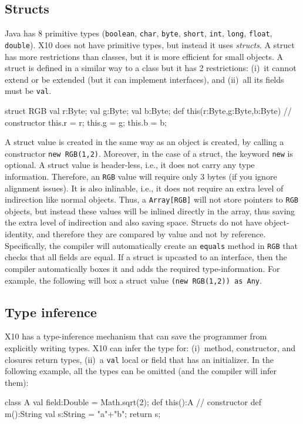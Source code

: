 \documentclass[a4paper]{article}
\def\codesmaller{\small}
\newcommand{\code}[1]{\texttt{\textup{\codesmaller #1}}}
\begin{document}
\subsection{Structs}
Java has 8 primitive types (\code{boolean}, \code{char}, \code{byte}, \code{short}, \code{int}, \code{long}, \code{float}, \code{double}).
X10 does not have primitive types, but instead it uses \emph{structs}.
A struct has more restrictions than classes, but it is more efficient for small objects.
A struct is defined in a similar way to a class but it has 2 restrictions:
    (i)~it cannot extend or be extended (but it can implement interfaces),
    and (ii)~all its fields must be \code{val}.
\begin{xten}
struct RGB {
  val r:Byte;
  val g:Byte;
  val b:Byte;
  def this(r:Byte,g:Byte,b:Byte) { // constructor
    this.r = r;
    this.g = g;
    this.b = b;
  }
}
\end{xten}
A struct value is created in the same way as an object is created, by calling a constructor \code{new RGB(1,2)}.
Moreover, in the case of a struct, the keyword \code{new} is optional.
A struct value is header-less, i.e., it does not carry any type information.
Therefore, an \code{RGB} value will require only 3 bytes (if you ignore alignment issues).
It is also inlinable, i.e., it does not require an extra level of indirection like normal objects.
Thus, a \code{Array[RGB]} will not store pointers to \code{RGB} objects, but instead these values will be inlined
    directly in the array, thus saving the extra level of indirection and also saving space.
Structs do not have object-identity, and therefore they are compared by value and not by reference.
Specifically, the compiler will automatically create an \code{equals} method in \code{RGB} that
    checks that all fields are equal.
If a struct is upcasted to an interface, then the compiler automatically boxes it and adds the required type-information.
For example, the following will box a struct value \code{(new RGB(1,2)) as Any}.


\subsection{Type inference}
X10 has a type-inference mechanism that can save the programmer from explicitly writing types.
X10 can infer the type for:
(i)~method, constructor, and closures return types,
(ii)~a \code{val} local or field that has an initializer.
In the following example, all the types can be omitted (and the compiler will infer them):
\begin{xten}
class A {
  val field:Double = Math.sqrt(2);
  def this():A {} // constructor
  def m():String {
    val s:String = "a"+"b";
    return s;
  }
}
\end{xten}
\end{document}
